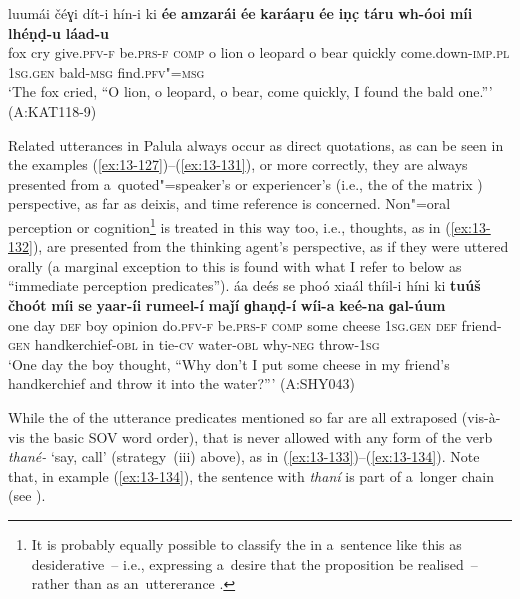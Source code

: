 \ex
\label{ex:13-131}
\gll luumái čéɣi dít-i hín-i ki \textbf{ée} \textbf{amzarái} \textbf{ée} \textbf{karáaṛu} \textbf{ée} \textbf{iṇc̣} \textbf{táru} \textbf{wh-óoi} \textbf{míi} \textbf{lhéṇḍ-u} \textbf{láad-u}\\
fox cry give.\textsc{pfv-f} be.\textsc{prs-f} \textsc{comp} o lion  o leopard o bear quickly come.down-\textsc{imp.pl} \textsc{1sg.gen} bald-\textsc{msg} find.\textsc{pfv"=msg}  \\
\glt `The fox cried, ``O lion, o leopard, o bear, come quickly, I found the bald one.''' (A:KAT118-9) 
\z

Related utterances in Palula always occur as direct quotations, as can be seen in the examples (\ref{ex:13-127})--(\ref{ex:13-131}), or more correctly, they are always presented from a~quoted"=speaker's or experiencer's (i.e., the  of the matrix ) perspective, as far as deixis,  and time reference is concerned. Non"=oral perception or cognition\footnote{It is probably equally possible to classify the  in a~sentence like this as desiderative~-- i.e., expressing a~desire that the proposition be realised~-- rather than as an~uttererance .} is treated in this way too, i.e., thoughts, as in (\ref{ex:13-132}), are presented from the thinking agent's perspective, as if they were uttered orally (a marginal exception to this is found with what I refer to below as ``immediate perception predicates''). 
\ea
\label{ex:13-132}
\gll áa deés se phoó xiaál thíil-i híni ki \textbf{tuúš} \textbf{čhoót} \textbf{míi} \textbf{se} \textbf{yaar-íi} \textbf{rumeel-í} \textbf{maǰí} \textbf{ɡhaṇḍ-í} \textbf{wíi-a} \textbf{keé-na} \textbf{ɡal-úum}\\
one day \textsc{def} boy opinion do.\textsc{pfv-f} be.\textsc{prs-f} \textsc{comp} some cheese \textsc{1sg.gen} \textsc{def} friend-\textsc{gen} handkerchief-\textsc{obl}  in tie-\textsc{cv} water-\textsc{obl} why-\textsc{neg} throw-\textsc{1sg}\\
\glt `One day the boy thought, ``Why don't I put some cheese in my friend's handkerchief and throw it into the water?''' (A:SHY043)
\z

While the  of the utterance predicates mentioned so far are all extraposed (vis-à-vis the basic SOV word order), that is never allowed with any form of the verb \textit{thané-} `say, call' (strategy~(iii) above), as in (\ref{ex:13-133})--(\ref{ex:13-134}). Note that, in example (\ref{ex:13-134}), the sentence with \textit{thaní} is part of a~longer  chain (see ).

